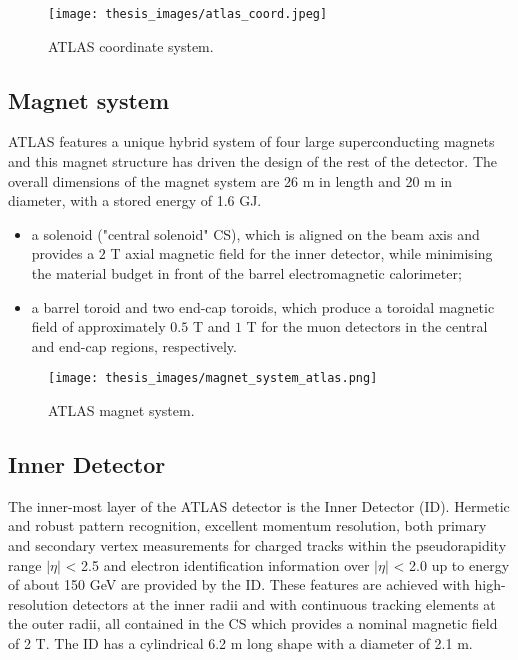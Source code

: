 \documentclass[a4paper, oneside, 11pt, openright]{book}
\begin{document}
				\begin{figure}[H]
					\centering
					\texttt{[image: thesis\_images/atlas\_coord.jpeg]}
					\caption{ATLAS coordinate system.}
				\end{figure}
				
			\subsection{Magnet system}
				ATLAS features a unique hybrid system of four large superconducting magnets and this magnet structure has driven the design of the rest of the detector. The overall dimensions of the magnet system are 26 m in length and 20 m in diameter, with a stored energy of 1.6 GJ.
				\begin{itemize}
					\item a solenoid ("central solenoid" CS), which is aligned on the beam axis and provides a $2$ T axial magnetic field for the inner detector,  while minimising the material budget in front of the barrel electromagnetic calorimeter;
					\item a  barrel  toroid and  two  end-cap  toroids, which  produce  a toroidal magnetic field of approximately $0.5$ T and $1$ T for the muon detectors in the central and end-cap regions, respectively.
				\end{itemize}
			
				\begin{figure}
					\centering
					\texttt{[image: thesis\_images/magnet\_system\_atlas.png]}
					\caption{ATLAS magnet system.}
				\end{figure}
			
			\subsection{Inner Detector}
				The inner-most layer of the ATLAS detector is the Inner Detector (ID). Hermetic and robust pattern recognition, excellent momentum resolution, both primary and secondary vertex measurements for charged tracks within the pseudorapidity range $|\eta|$ < 2.5 and electron identification information over $|\eta|$ < 2.0 up to energy of about 150 GeV are provided by the ID. These features are achieved with high-resolution detectors at the inner radii and  with continuous tracking elements at the outer radii, all contained in the CS which provides a nominal magnetic field of 2 T. The ID has a cylindrical 6.2 m long shape with a diameter of 2.1 m.
				
\end{document}
